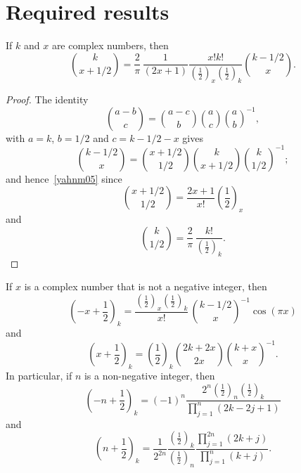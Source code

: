 \documentclass[12pt,reqno]{article}
\begin{document}
\section{Required results}
\begin{lemma}
If $k$ and $x$ are complex numbers, then
\begin{equation}\label{yahnm05}
\binom{{k}}{{x + 1/2}} = \frac{2}{\pi }\,\frac{1}{{\left( {2x + 1} \right)}}\frac{{x!k!}}{{\left( {\frac{1}{2}} \right)_x \left( {\frac{1}{2}} \right)_k }}\binom{{k - 1/2}}{x}.
\end{equation}
\end{lemma}
\begin{proof}
The identity
\begin{equation}\label{w7han3w}
\binom{{a - b}}{c} = \binom{{a - c}}{b}\binom{{a}}{c}\binom{{a}}{b}^{ - 1} ,
\end{equation}
with $a=k$, $b=1/2$ and $c=k-1/2-x$ gives
\begin{equation}
\binom{{k - 1/2}}{x} = \binom{{x + 1/2}}{{1/2}}\binom{{k}}{{x + 1/2}}\binom{{k}}{{1/2}}^{ - 1}; 
\end{equation}
and hence~\eqref{yahnm05} since
\begin{equation}
\binom{{x + 1/2}}{{1/2}} = \frac{{2x + 1}}{{x!}}\left( {\frac{1}{2}} \right)_x 
\end{equation}
and
\begin{equation}
\binom{{k}}{{1/2}} = \frac{2}{\pi }\,\frac{{k!}}{{\left( {\frac{1}{2}} \right)_k }}.
\end{equation}
\end{proof}
\begin{lemma}\label{w00yljy}
If $x$ is a complex number that is not a negative integer, then
\begin{equation}\label{l5fmdri}
\left( { - x + \frac{1}{2}} \right)_k  = \frac{{\left( {\frac{1}{2}} \right)_x \left( {\frac{1}{2}} \right)_k }}{{x!}}\,\binom{{k - 1/2}}{x}^{ - 1} \cos \left( \pi x \right)
\end{equation}
and
\begin{equation}\label{bjv8z0f}
\left( {x + \frac{1}{2}} \right)_k  = \left( {\frac{1}{2}} \right)_k \binom{{2k + 2x}}{{2x}}\binom{{k + x}}{x}^{ - 1}.
\end{equation}
In particular, if $n$ is a non-negative integer, then
\begin{equation}\label{mq7ny8m}
\left( { - n + \frac{1}{2}} \right)_k  = ( - 1)^n \frac{{2^n \left( {\frac{1}{2}} \right)_n \left( {\frac{1}{2}} \right)_k }}{{\prod_{j = 1}^n {\left( {2k - 2j + 1} \right)} }}
\end{equation}
and
\begin{equation}\label{t0khqm8}
\left( {n + \frac{1}{2}} \right)_k  = \frac{1}{{2^{2n} }}\frac{{\left( {\frac{1}{2}} \right)_k }}{{\left( {\frac{1}{2}} \right)_n }}\frac{{\prod_{j = 1}^{2n} {\left( {2k + j} \right)} }}{{\prod_{j = 1}^n {\left( {k + j} \right)} }}.
\end{equation}
\end{lemma}
\end{document}
